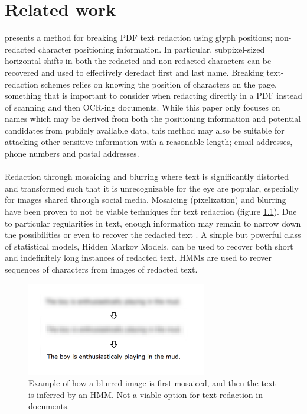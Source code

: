 \chapter{Related work}

\cite{bland2022story} presents a method for breaking PDF text redaction using glyph positions; non-redacted character positioning information. In particular, subpixel-sized horizontal shifts in both the redacted and non-redacted characters can be recovered and used to effectively deredact first and last name. Breaking text-redaction schemes relies on knowing the position of characters on the page, something that is important to consider when redacting directly in a PDF instead of scanning and then OCR-ing documents. While this paper only focuses on names which may be derived from both the positioning information and potential candidates from publicly available data, this method may also be suitable for attacking other sensitive information with a reasonable length; email-addresses, phone numbers and postal addresses.
\\\\
Redaction through mosaicing and blurring where text is significantly distorted and transformed such that it is unrecognizable for the eye are popular, especially for images shared through social media. Mosaicing (pixelization) and blurring have been proven to not be viable techniques for text redaction (figure \ref{fig:blurredredaction}). Due to particular regularities in text, enough information may remain to narrow down the possibilities or even to recover the redacted text \cite{hill2016effectiveness}. A simple but powerful class of statistical models, Hidden Markov Models, can be used to recover both short and indefinitely long instances of redacted text. HMMs are used to reover sequences of characters from images of redacted text. 
\begin{figure}[h]
\includegraphics[width=0.7\textwidth]{latex/media/blurredRedaction.png}
\centering
\caption{Example of how a blurred image is first mosaiced, and then the text is inferred by an HMM. Not a viable option for text redaction in documents.}
\label{fig:blurredredaction}
\end{figure}

